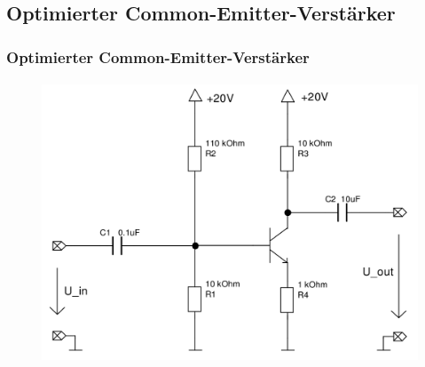 \subsection{Optimierter Common-Emitter-Verstärker} %
\label{sub:Optimierter_Common-Emitter-Verstärker}
\begin{frame}
    \frametitle{Optimierter Common-Emitter-Verstärker}
    \framesubtitle{}
    \begin{figure}[H]
    \begin{center}
            \includegraphics[scale=0.2]{./img/schaltungen/common_emitter_optimiert.png}
    \end{center}
    \end{figure}
        
\end{frame}

